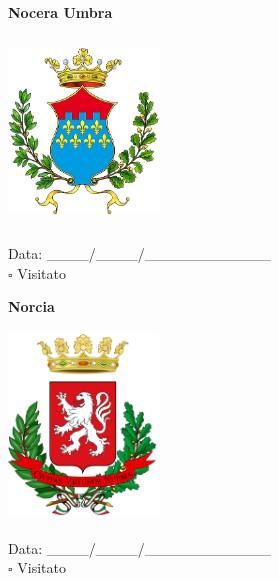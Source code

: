 \documentclass[a5paper,12pt]{article}
\begin{document}
\newpage

\noindent
\begin{minipage}[t]{0.45\textwidth}
    \begin{center}
        \textbf{Nocera Umbra}
    \end{center}
    \vspace{-0.5cm} %
    \begin{center}
        \includegraphics[height= 5cm, width=4cm]{Umbria/Stemma Nocera Umbra.png}
    \end{center}
    \vspace{-0.4cm} %
    \begin{flushleft}
        Data: \_\_\_\_/\_\_\_\_/\_\_\_\_\_\_\_\_\_\_\_\_ \\
        $\square$ Visitato
    \end{flushleft}
\end{minipage}
\hfill
\noindent
\begin{minipage}[t]{0.45\textwidth}
    \begin{center}
        \textbf{Norcia}
    \end{center}
    \vspace{-0.5cm} %
    \begin{center}
        \includegraphics[height= 5cm, width=4cm]{Umbria/Stemma Norcia.png}
    \end{center}
    \vspace{-0.4cm} %
    \begin{flushleft}
        Data: \_\_\_\_/\_\_\_\_/\_\_\_\_\_\_\_\_\_\_\_\_ \\
        $\square$ Visitato
    \end{flushleft}
\end{minipage}
\end{document}
